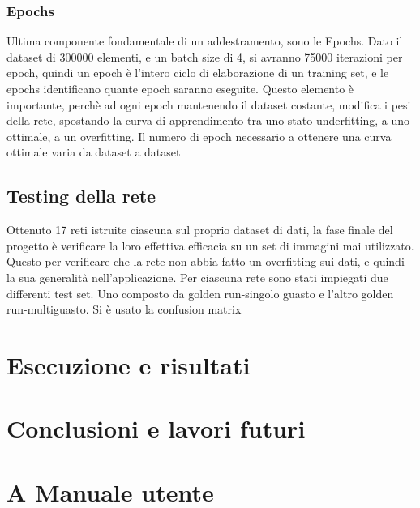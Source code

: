 \documentclass[14pt]{extarticle}
\begin{document}
\subsubsection{Epochs}
Ultima componente fondamentale di un addestramento, sono le Epochs.
Dato il dataset di 300000 elementi, e un batch size di 4, si avranno 75000 iterazioni per epoch, quindi un epoch è l'intero ciclo di elaborazione di un training set, e le epochs identificano quante epoch saranno eseguite. Questo elemento è importante, perchè ad ogni epoch mantenendo il dataset costante, modifica i pesi della rete, spostando la curva di apprendimento tra uno stato underfitting, a uno ottimale, a un overfitting. 
Il numero di epoch necessario a ottenere una curva ottimale varia da dataset a dataset

\subsection{Testing della rete}
Ottenuto 17 reti istruite ciascuna sul proprio dataset di dati, la fase finale del progetto è verificare la loro effettiva efficacia su un set di immagini mai utilizzato. Questo per verificare che la rete non abbia fatto un overfitting sui dati, e quindi la sua  generalità nell'applicazione.
Per ciascuna rete sono stati impiegati due differenti test set. Uno composto da golden run-singolo guasto e l'altro golden run-multiguasto. 
Si è usato la confusion matrix
\section{Esecuzione e risultati}

\section{Conclusioni e lavori futuri}

\section{A Manuale utente}

\newpage
\printbibliography
\end{document}

